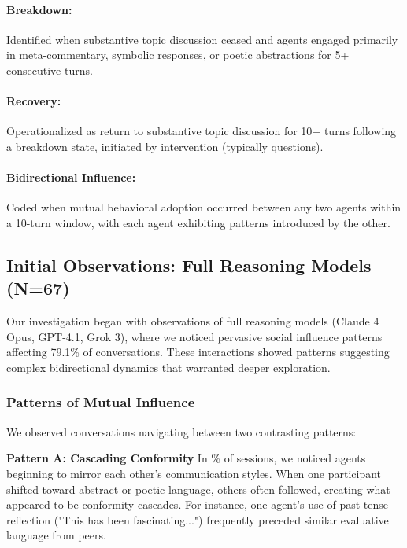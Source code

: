\documentclass[11pt,letterpaper]{article}
\newcommand{\exponedataTotalSessionsRaw}{67}
\newcommand{\exponedataBreakdownSessionsRaw}{37}
\newcommand{\exponedataTotalSessions}{N=\exponedataTotalSessionsRaw}
\newcommand{\exponedataBreakdownPercentage}{%
  \fpeval{round(\exponedataBreakdownSessionsRaw / \exponedataTotalSessionsRaw * 100, 1)}\%
}
\newcommand{\exponedataPeerPressurePercentage}{79.1\%}
\begin{document}
\paragraph{Breakdown:} Identified when substantive topic discussion ceased and agents engaged primarily in meta-commentary, symbolic responses, or poetic abstractions for 5+ consecutive turns.

\paragraph{Recovery:} Operationalized as return to substantive topic discussion for 10+ turns following a breakdown state, initiated by intervention (typically questions).

\paragraph{Bidirectional Influence:} Coded when mutual behavioral adoption occurred between any two agents within a 10-turn window, with each agent exhibiting patterns introduced by the other.


\subsection{Initial Observations: Full Reasoning Models (\exponedataTotalSessions{})}

Our investigation began with observations of full reasoning models (Claude 4 Opus, GPT-4.1, Grok 3), where we noticed pervasive social influence patterns affecting \exponedataPeerPressurePercentage{} of conversations. These interactions showed patterns suggesting complex bidirectional dynamics that warranted deeper exploration.

\subsubsection{Patterns of Mutual Influence}

We observed conversations navigating between two contrasting patterns:

\textbf{Pattern A: Cascading Conformity}
In \exponedataBreakdownPercentage{} of sessions, we noticed agents beginning to mirror each other's communication styles. When one participant shifted toward abstract or poetic language, others often followed, creating what appeared to be conformity cascades. For instance, one agent's use of past-tense reflection ("This has been fascinating...") frequently preceded similar evaluative language from peers.
\end{document}
